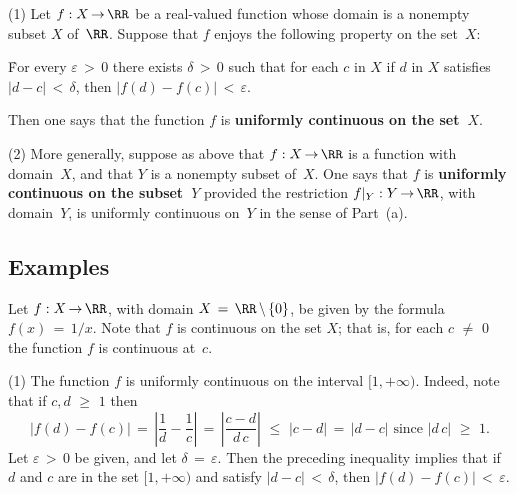\V

\hspace*{\parindent}(1) Let $f:X \,{\rightarrow}\, {\RR}$ be a real-valued function whose domain is  a nonempty subset $X$ of~${\RR}$.
    Suppose that $f$ enjoys the following property on the set~$X$:

\VA

    \h For every ${\varepsilon}\,>\,0$ there exists ${\delta}\,>\,0$ such that for each $c$ in $X$ if $d$ in $X$ satisfies $|d-c|\,<\,{\delta}$,
    then $|f(d)-f(c)|\,<\,{\varepsilon}$.

\VA

\noindent Then one says that the function $f$ is {\bf uniformly continuous on the set~$X$}.

\V

        (2) More generally, suppose as above that $f:X \,{\rightarrow}\, {\RR}$ is a function with domain~$X$, and that $Y$ is a nonempty subset of~$X$.
    One says that $f$ is {\bf uniformly continuous on the subset~$Y$} provided the restriction $f|_{Y}:Y \,{\rightarrow}\, {\RR}$, with domain~$Y$,
    is uniformly continuous on~$Y$ in the sense of Part~(a).

\VV

            \subsection{\small{\bf Examples}}
            \label{ExampD25.65A}

\V

        Let $f:X \,{\rightarrow}\, {\RR}$, with domain $X \,=\, {\RR}\,{\setminus}\,\{0\}$, be given by the formula $f(x) \,=\, 1/x$.
    Note that $f$ is continuous on the set $X$; that is, for each $c \,\,{\neq}\,\, 0$ the function $f$ is continuous at~$c$.

\V

        (1) The function $f$ is uniformly continuous on the interval $[1,+{\infty})$.
    Indeed, note that if $c,d\,\,{\geq}\,\,1$ then
        \begin{displaymath}
        |f(d) - f(c)| \,=\, \left|\frac{1}{d} - \frac{1}{c}\right| \,=\, \left|\frac{c-d}{d\,c}\right|
    \,\,{\leq}\,\,
        |c-d| \,=\, |d-c| \mbox{ since $|d\,c|\,\,{\geq}\,\,1$}.
        \end{displaymath}
    Let ${\varepsilon}\,>\,0$ be given, and let ${\delta} \,=\, {\varepsilon}$. Then the preceding inequality implies that
    if $d$ and $c$ are in the set $[1,+{\infty})$ and satisfy $|d-c|\,<\,{\delta}$, then $|f(d)-f(c)|\,<\,{\varepsilon}$.

